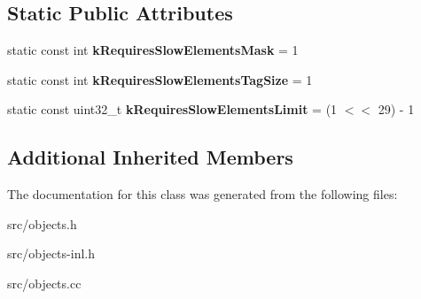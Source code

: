 \subsection*{Static Public Attributes}
\begin{DoxyCompactItemize}
\item 
\hypertarget{classv8_1_1internal_1_1_seeded_number_dictionary_af07975b7d5f2fa40f44c564f03f7bfa6}{}static const int {\bfseries k\+Requires\+Slow\+Elements\+Mask} = 1\label{classv8_1_1internal_1_1_seeded_number_dictionary_af07975b7d5f2fa40f44c564f03f7bfa6}

\item 
\hypertarget{classv8_1_1internal_1_1_seeded_number_dictionary_a34f7717701c83f02c689d60d9ac3c402}{}static const int {\bfseries k\+Requires\+Slow\+Elements\+Tag\+Size} = 1\label{classv8_1_1internal_1_1_seeded_number_dictionary_a34f7717701c83f02c689d60d9ac3c402}

\item 
\hypertarget{classv8_1_1internal_1_1_seeded_number_dictionary_a60c8f3972587f54903789d0e08451809}{}static const uint32\+\_\+t {\bfseries k\+Requires\+Slow\+Elements\+Limit} = (1 $<$$<$ 29) -\/ 1\label{classv8_1_1internal_1_1_seeded_number_dictionary_a60c8f3972587f54903789d0e08451809}

\end{DoxyCompactItemize}
\subsection*{Additional Inherited Members}


The documentation for this class was generated from the following files\+:\begin{DoxyCompactItemize}
\item 
src/objects.\+h\item 
src/objects-\/inl.\+h\item 
src/objects.\+cc\end{DoxyCompactItemize}
